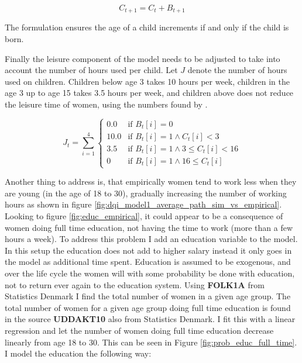 \begin{equation}
    C_{t+1} = C_t + B_{t+1}
\end{equation}

The formulation ensures the age of a child increments if and only if the child is born.

Finally the leisure component of the model needs to be adjusted to take into account the number of hours used per child. Let $J$ denote the number of hours used on children. Children below age 3 takes 10 hours per week, children in the age 3 up to age 15 takes 3.5 hours per week, and children above does not reduce the leisure time of women,  using the numbers found by \textcite{ekert-jaffe_time_2015}. 

\begin{equation}
    J_t = \sum_{i=1}^4 \begin{cases}
        0.0 & \text{if } B_t[i] = 0 \\
        10.0 & \text{if } B_t[i] = 1 \land C_t[i] < 3 \\
        3.5 & \text{if } B_t[i] = 1 \land 3 \leq C_t[i] < 16 \\
        0 & \text{if } B_t[i] = 1 \land  16 \leq  C_t[i] 
    \end{cases}
\end{equation}

Another thing to address is, that empirically women tend to work less when they are young (in the age of 18 to 30), gradually increasing the number of working hours as shown in figure \ref{fig:dqi_model1_average_path_sim_vs_empirical}.  Looking to figure \ref{fig:educ_empirical}, it could appear to be a consequence of women doing full time education, not having the time to work (more than a few hours a week). To address this problem I add an education variable to the model. In this setup the education does not add to higher salary instead it only goes in the model as additional time spent. Education is assumed to be exogenous, and over the life cycle the women will with some probability be done with education, not to return ever again to the education system. Using \textbf{FOLK1A} from Statistics Denmark I find the total number of women in a given age group. The total number of women for a given age group doing full time education is found in the source \textbf{UDDAKT10} also from Statistics Denmark. I fit this with a linear regression and let the number of women doing full time education decrease linearly from age 18 to 30. This can be seen in Figure \ref{fig:prob_educ_full_time}. I model the education the following way:

